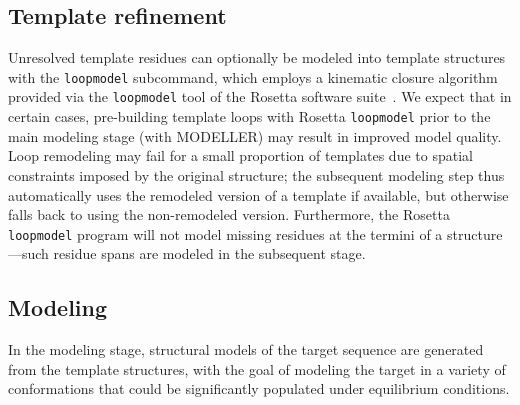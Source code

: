\documentclass[aps,prl,preprint,nofootinbib,superscriptaddress,linenumbers]{revtex4-1}
\begin{document}
\subsection{Template refinement}

Unresolved template residues can optionally be modeled into template structures with the {\tt loopmodel} subcommand, which employs a kinematic closure algorithm provided via the {\tt loopmodel} tool of the Rosetta software suite~\cite{qian:nature:2007:modeller,wang:jmb:2007:modeller}.
We expect that in certain cases, pre-building template loops with Rosetta {\tt loopmodel} prior to the main modeling stage (with MODELLER) may result in improved model quality.
Loop remodeling may fail for a small proportion of templates due to spatial constraints imposed by the original structure; the subsequent modeling step thus automatically uses the remodeled version of a template if available, but otherwise falls back to using the non-remodeled version.
Furthermore, the Rosetta {\tt loopmodel} program will not model missing residues at the termini of a structure---such residue spans are modeled in the subsequent stage.


\subsection{Modeling}

In the modeling stage, structural models of the target sequence are generated from the template structures, with the goal of modeling the target in a variety of conformations that could be significantly populated under equilibrium conditions.
\end{document}
